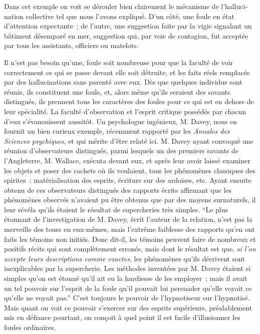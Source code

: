 \documentclass[french,twoside]{book} %
\begin{document}
Dans cet exemple on voit se dérouler bien clairement le mécanisme de l’halluci­nation collective tel que nous l’avons expliqué. D’un côté, une foule en état d’atten­tion expectante ; de l’autre, une suggestion faite par la vigie signalant un bâtiment désemparé en mer, suggestion qui, par voie de contagion, fut acceptée par tous les assistants, officiers ou matelots.\par
Il n’est pas besoin qu’une, foule soit nombreuse pour que la faculté de voir correctement ce qui se passe devant elle soit détruite, et les faits réels remplacés par des hallucinations sans parenté avec eux. Dès que quelques individus sont réunis, ils constituent une foule, et, alors même qu’ils seraient des savants distingués, ils pren­nent tous les caractères des foules pour ce qui est en dehors de leur spécialité. La faculté d’observation et l’esprit critique possédés par chacun d’eux s’évanouissent aussitôt. Un psychologue ingénieux, M. Davey, nous en fournit un bien curieux exemple, récemment rapporté par les \emph{Annales des Sciences psychiques}, et qui mérite d’être relaté ici. M. Davey ayant convoqué une réunion d’observateurs distingués, parmi lesquels un des premiers savants de l’Angleterre, M. Wallace, exécuta devant eux, et après leur avoir laissé examiner les objets et poser des cachets où ils voulaient, tous les phénomènes classiques des spirites : matérialisation des esprits, écriture sur des ardoises, etc. Ayant ensuite obtenu de ces observateurs distingués des rapports écrits affirmant que les phénomènes observés n’avaient pu être obtenus que par des moyens surnaturels, il leur révéla qu’ils étaient le résultat de supercheries très simples. “Le plus étonnant de l’investigation de M. Davey, écrit l’auteur de la relation, n’est pas la merveille des tours en eux-mêmes, mais l’extrême faiblesse des rapports qu’en ont faits les témoins non initiés. Donc dit-il, les témoins peuvent faire de nombreux et positifs récits qui sont complètement erronés, mais dont le résultat est que, \emph{si l’on accepte leurs descriptions comme exactes}, les phénomènes qu’ils décrivent sont inexplicables par la supercherie. Les méthodes inventées par M. Davey étaient si simples qu’on est étonné qu’il ait eu la hardiesse de les employer ; mais il avait un tel pouvoir sur l’esprit de la foule qu’il pouvait lui persuader qu’elle voyait ce qu’elle ne voyait pas.” C’est toujours le pouvoir de l’hypnotiseur sur l’hypnotisé. Mais quant on voit ce pouvoir s’exercer sur des esprits supérieurs, préalablement mis en défiance pourtant, on conçoit à quel point il est facile d’illusionner les foules ordinaires.\par
\end{document}
